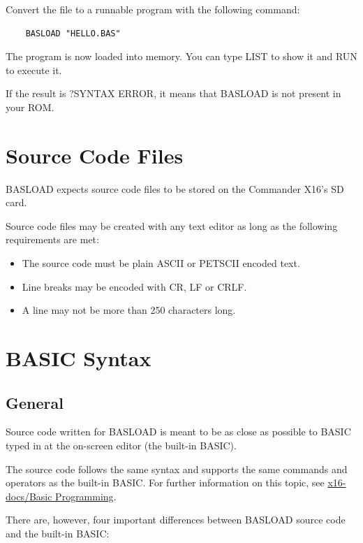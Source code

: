 \documentclass{article}
\begin{document}
    Convert the file to a runnable program with the following
    command:

    \begin{verbatim}
    BASLOAD "HELLO.BAS"
    \end{verbatim}

    The program is now loaded into memory. You can type LIST to
    show it and RUN to execute it.

    If the result is ?SYNTAX ERROR, it means that BASLOAD is not
    present in your ROM.

\section{Source Code Files}

    BASLOAD expects source code files to be stored on the 
    Commander X16's SD card.

    Source code files may be created with any text editor as
    long as the following requirements are met:

    \begin{itemize}
        \item The source code must be plain ASCII or PETSCII encoded text.
        \item Line breaks may be encoded with CR, LF or CRLF.
        \item A line may not be more than 250 characters long.
    \end{itemize}

\section{BASIC Syntax}

    \subsection{General}

        Source code written for BASLOAD is meant to be as close as
        possible to BASIC typed in at the on-screen editor
        (the built-in BASIC).

        The source code follows the same syntax and supports the
        same commands and operators as the built-in
        BASIC. For further information on this topic, see
        \href{https://github.com/X16Community/x16-docs/blob/master/X16%20Reference%20-%2003%20-%20BASIC.md}
        {x16-docs/Basic Programming}.

        There are, however, four important differences between
        BASLOAD source code and the built-in BASIC:
\end{document}
